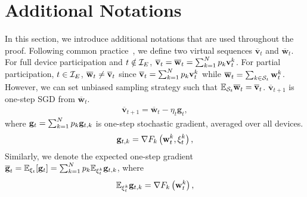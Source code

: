 
\section{Additional Notations}
\label{sec:app:notations}
In this section, we introduce additional notations that are used throughout
the proof. Following common practice~\cite{stich2018local,li2019convergence}, we define two virtual sequences $\overline{\mathbf{v}}_{t}$ and $\overline{\mathbf{w}}_{t}$. For full device participation and $t \notin {\mathcal{I}}_E$,
${\overline{\mathbf{v}}}_t = {\overline{\mathbf{w}}}_t =\sum_{k=1}^{N} p_{k} \mathbf{v}_{t}^{k}$. For partial participation, $t \in {\mathcal{I}}_E$, ${\overline{\mathbf{w}}}_t \neq {\overline{\mathbf{v}}}_t$ since ${\overline{\mathbf{v}}}_t=\sum_{k=1}^{N} p_{k} \mathbf{v}_{t}^{k}$ while ${\overline{\mathbf{w}}}_t=\sum_{k\in {\mathcal{S}}_t}\mathbf{w}_{t}^{k}$. However, we can
set unbiased sampling strategy such that $ \mathbb{E}_{{\mathcal{S}}_t} {\overline{\mathbf{w}}}_t = {\overline{\mathbf{v}}}_t$.
$\overline{\mathbf{v}}_{t+1}$ is one-step SGD from $\overline{\mathbf{w}}_{t}$. 
\begin{align}
\overline{\mathbf{v}}_{t+1}=\overline{\mathbf{w}}_{t}-\eta_{t} \mathbf{g}_{t},	\label{eq:vbar}
\end{align}
where ${\mathbf{g}}_{t} = \sum_{k=1}^{N} p_{k} {\mathbf{g}}_{t,k} $ is one-step stochastic gradient, averaged over all devices. 
\begin{align*}
{\mathbf{g}}_{t,k} = \nabla F_{k}\left(\mathbf{w}_{t}^{k},\mathbf{\xi}_{t}^{k} \right),   
\end{align*}
Similarly, we denote the expected one-step gradient ${\overline{\mathbf{g}}}_{t}= \mathbb{E}_{\xi_t}[{\mathbf{g}}_t] = \sum_{k=1}^{N} p_{k} \mathbb{E}_{\mathbf{\xi}_{t}^{k}} {\mathbf{g}}_{t,k}$, where
\begin{align}
\mathbb{E}_{\mathbf{\xi}_{t}^{k}} {\mathbf{g}}_{t,k}  = \nabla F_{k}\left(\mathbf{w}_{t}^{k}\right), 
\label{eq:gradient}
\end{align}
